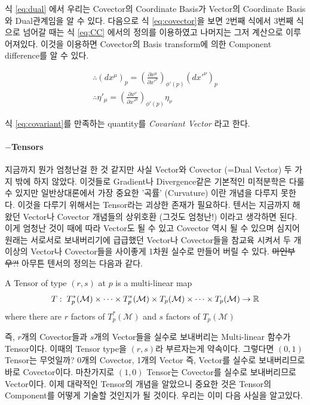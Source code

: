 \documentclass[paper=a4, fontsize=11pt]{scrartcl} %
\numberwithin{equation}{section} %
\numberwithin{figure}{section} %
\numberwithin{table}{section} %
\theoremstyle{plain}
\newcommand{\Hs}{\hspace{0.1cm}}
\newcommand{\HS}{\hspace{0.5cm}}
\newcommand{\VS}{\vspace{0.3cm}}
\newcommand{\PD}[2]{\frac{\partial #1}{\partial #2}}
\newcommand{\BKS}[1]{\left( #1 \right)}
\newcommand{\Tangent}{T_p (\Manifold)}
\newcommand{\Cotangent}{T^{*}_p (\Manifold)}
\newcommand{\Manifold}{\mathcal{M}}
\begin{document}
\pagebreak

\HS 식 \ref{eq:dual} 에서 우리는 Covector의 Coordinate Basis가 Vector의 Coordinate Basis와 Dual관계임을 알 수 있다. 다음으로 식 \ref{eq:covector}을 보면 2번째 식에서 3번째 식으로 넘어갈 때는
식 \ref{eq:CC} 에서의 정의를 이용하였고 나머지는 그저 계산으로 이루어져있다. 이것을 이용하면 Covector의 Basis transform에 의한 Component difference를 알 수 있다.

\begin{gather}
 \therefore (dx^{\mu})_p = \BKS{\PD{x^{\mu}}{x'^{\nu}}}_{\phi'(p)} (dx'^{\nu})_p \\
 \therefore \eta'_{\mu} = \BKS{\PD{x^{\nu}}{x'^{\mu}}}_{\phi'(p)} \eta_{\nu} 
 \label{eq:covariant}
\end{gather}

식 \ref{eq:covariant}를 만족하는 quantity를 \emph{Covariant Vector} 라고 한다.

\paragraph{$-$Tensors}

지금까지 뭔가 엄청난걸 한 것 같지만 사실 Vector와 Covector (=Dual Vector) 두 가지 밖에 하지 않았다. 이것들로 Gradient나 Divergence같은 기본적인 미적분학은 다룰 수 있지만
일반상대론에서 가장 중요한 '곡률' (Curvature) 이란 개념을 다루지 못한다. 이것을 다루기 위해서는 Tensor라는 괴상한 존재가 필요하다. 
텐서는 지금까지 해왔던 Vector나 Covector 개념들의 상위호환 (그것도 엄청난!) 이라고 생각하면 된다. 이게 엄청난 것이 때에 따라 Vector도 될 수 있고 Covector 역시 될 수 있으며 심지어
원래는 서로서로 보내버리기에 급급했던 Vector나 Covector들을 참교육 시켜서 두 개 이상의 Vector나 Covector들을 사이좋게 1차원 실수로 만들어 버릴 수 있다. \sout{마인부우?!} \Hs 아무튼 텐서의 정의는 다음과 같다.

\vspace{0.4cm}

\begin{defn}
 A Tensor of type $(r,s)$ at $p$ is a multi-linear map 
 \begin{equation*}
  T : \Hs \Cotangent \times \cdots \times \Cotangent \times \Tangent \times \cdots \times \Tangent \rightarrow \mathbb{R}
 \end{equation*}
 where there are $r$ factors of $\Cotangent$ and $s$ factors of $\Tangent$
\end{defn}

\VS

즉, $r$개의 Covector들과 $s$개의 Vector들을 실수로 보내버리는 Multi-linear 함수가 Tensor이다. 이때의 Tensor type을 $(r,s)$라 부르자는게 약속이다. 
그렇다면 $(0,1)$ Tensor는 무엇일까? 0개의 Covector, 1개의 Vector 즉, Vector를 실수로 보내버리므로 바로 Covector이다. 마찬가지로 $(1,0)$ Tensor는 Covector를 실수로 보내버리므로
Vector이다. 이제 대략적인 Tensor의 개념을 알았으니 중요한 것은 Tensor의 Component를 어떻게 기술할 것인지가 될 것이다. 우리는 이미 다음 사실을 알고있다.
\end{document}
